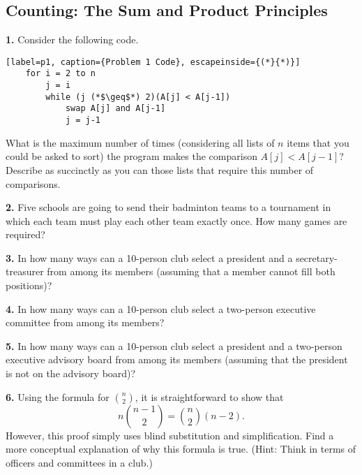 \documentclass[12pt, letterpaper]{article}
\theoremstyle{definition}
\begin{document}
\subsection*{Counting: The Sum and Product Principles}

\vspace*{0.3in}\noindent
\textbf{1.} Consider the following code.
\begin{center}
    \begin{lstlisting}[label=p1, caption={Problem 1 Code}, escapeinside={(*}{*)}]
    for i = 2 to n
        j = i
        while (j (*$\geq$*) 2)(A[j] < A[j-1])
            swap A[j] and A[j-1]
            j = j-1
    \end{lstlisting}
\end{center}
What is the maximum number of times (considering all lists of $n$ items that
you could be asked to sort) the program makes the comparison $A[j] < A[j - 1]$?
Describe as succinctly as you can those lists that require this number of
comparisons.

\vspace*{0.3in}\noindent
\textbf{2.} Five schools are going to send their badminton teams to a tournament
in which each team must play each other team exactly once. How many games are
required?

\vspace*{0.3in}\noindent
\textbf{3.} In how many ways can a 10-person club select a president and a
secretary-treasurer from among its members (assuming that a member cannot fill
both positions)?

\vspace*{0.3in}\noindent
\textbf{4.} In how many ways can a 10-person club select a two-person executive
committee from among its members?

\vspace*{0.3in}\noindent
\textbf{5.} In how many ways can a 10-person club select a president and a
two-person executive advisory board from among its members (assuming that the
president is not on the advisory board)?

\vspace*{0.3in}\noindent
\textbf{6.} Using the formula for $\binom{n}{2}$, it is straightforward to show
that
\begin{equation*}
    n\binom{n-1}{2} = \binom{n}{2}(n-2).
\end{equation*}
However, this proof simply uses blind substitution and simplification.
Find a more conceptual explanation of why this formula is true.
(Hint: Think in terms of officers and committees in a club.)
\end{document}
